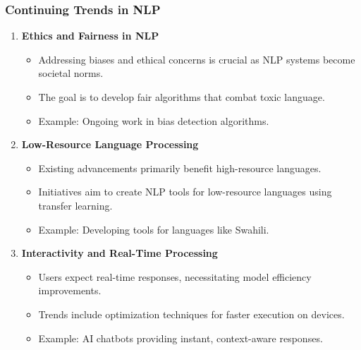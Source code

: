 \documentclass[aspectratio=169]{beamer}
\begin{document}
\begin{frame}[fragile]
    \frametitle{Continuing Trends in NLP}
    \begin{enumerate}[resume]
        \item \textbf{Ethics and Fairness in NLP}
            \begin{itemize}
                \item Addressing biases and ethical concerns is crucial as NLP systems become societal norms.
                \item The goal is to develop fair algorithms that combat toxic language.
                \item Example: Ongoing work in bias detection algorithms.
            \end{itemize}
        \item \textbf{Low-Resource Language Processing}
            \begin{itemize}
                \item Existing advancements primarily benefit high-resource languages.
                \item Initiatives aim to create NLP tools for low-resource languages using transfer learning.
                \item Example: Developing tools for languages like Swahili.
            \end{itemize}
        \item \textbf{Interactivity and Real-Time Processing}
            \begin{itemize}
                \item Users expect real-time responses, necessitating model efficiency improvements.
                \item Trends include optimization techniques for faster execution on devices.
                \item Example: AI chatbots providing instant, context-aware responses.
            \end{itemize}
    \end{enumerate}
\end{frame}
\end{document}

